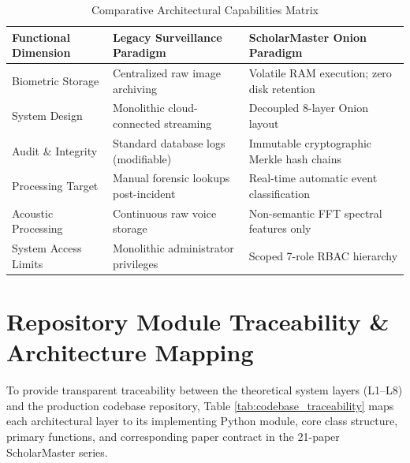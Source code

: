\documentclass[12pt,a4paper,oneside]{report}
\begin{document}
\begin{table}[htbp]
\caption{Comparative Architectural Capabilities Matrix}
\centering
\small
{}
\begin{tabular}{@{}p{1.4in} p{2.0in} p{2.0in}@{}}
\hline
\textbf{Functional Dimension} & \textbf{Legacy Surveillance Paradigm} & \textbf{ScholarMaster Onion Paradigm} \\ \hline
Biometric Storage & Centralized raw image archiving & Volatile RAM execution; zero disk retention \\ \hline
System Design & Monolithic cloud-connected streaming & Decoupled 8-layer Onion layout \\ \hline
Audit \& Integrity & Standard database logs (modifiable) & Immutable cryptographic Merkle hash chains \\ \hline
Processing Target & Manual forensic lookups post-incident & Real-time automatic event classification \\ \hline
Acoustic Processing & Continuous raw voice storage & Non-semantic FFT spectral features only \\ \hline
System Access Limits & Monolithic administrator privileges & Scoped 7-role RBAC hierarchy \\ \hline
\end{tabular}
\label{tab:system_comparison}
\end{table}

\section{Repository Module Traceability & Architecture Mapping}
To provide transparent traceability between the theoretical system layers (L1--L8) and the production codebase repository, Table \ref{tab:codebase_traceability} maps each architectural layer to its implementing Python module, core class structure, primary functions, and corresponding paper contract in the 21-paper ScholarMaster series.
\end{document}
